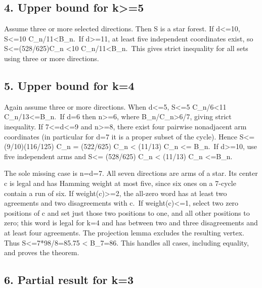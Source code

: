 \documentclass[
  10pt,
]{article}
\begin{document}
\subsection{4. Upper bound for
k\textgreater=5}\label{upper-bound-for-k5}

Assume three or more selected directions. Then S is a star forest. If
d\textless=10, \textbar S\textbar\textless=10 C\_n/11\textless B\_n.~If
d\textgreater=11, at least five independent coordinates exist, so
\textbar S\textbar\textless=(528/625)C\_n \textless10
C\_n/11\textless B\_n.~This gives strict inequality for all sets using
three or more directions.

\subsection{5. Upper bound for k=4}\label{upper-bound-for-k4}

Again assume three or more directions. When d\textless=5,
\textbar S\textbar\textless=5 C\_n/6\textless11
C\_n/13\textless=B\_n.~If d=6 then n\textgreater=6, where
B\_n/C\_n\textgreater6/7, giving strict inequality. If
7\textless=d\textless=9 and n\textgreater=8, there exist four pairwise
nonadjacent arm coordinates (in particular for d=7 it is a proper subset
of the cycle). Hence \textbar S\textbar\textless= (9/10)(116/125) C\_n =
(522/625) C\_n \textless{} (11/13) C\_n \textless= B\_n.~If
d\textgreater=10, use five independent arms and
\textbar S\textbar\textless= (528/625) C\_n \textless{} (11/13) C\_n
\textless=B\_n.

The sole missing case is n=d=7. All seven directions are arms of a star.
Its center c is legal and has Hamming weight at most five, since six
ones on a 7-cycle contain a run of six. If weight(c)\textgreater=2, the
all-zero word has at least two agreements and two disagreements with
c.~If weight(c)\textless=1, select two zero positions of c and set just
those two positions to one, and all other positions to zero; this word
is legal for k=4 and has between two and three disagreements and at
least four agreements. The projection lemma excludes the resulting
vertex. Thus \textbar S\textbar\textless=7*98/8=85.75 \textless{}
B\_7=86. This handles all cases, including equality, and proves the
theorem.

\subsection{6. Partial result for k=3}\label{partial-result-for-k3}
\end{document}
